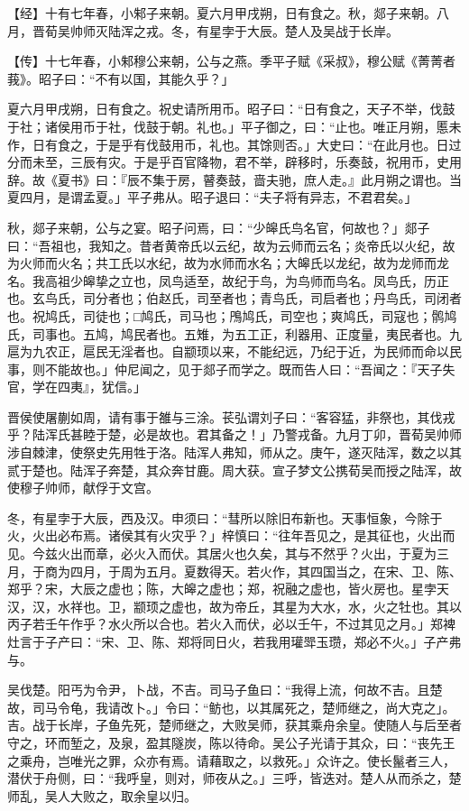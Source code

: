\documentclass[]{article}
\begin{document}
【经】十有七年春，小邾子来朝。夏六月甲戌朔，日有食之。秋，郯子来朝。八月，晋荀吴帅师灭陆浑之戎。冬，有星孛于大辰。楚人及吴战于长岸。

【传】十七年春，小邾穆公来朝，公与之燕。季平子赋《采叔》，穆公赋《菁菁者莪》。昭子曰：``不有以国，其能久乎？」

夏六月甲戌朔，日有食之。祝史请所用币。昭子曰：``日有食之，天子不举，伐鼓于社；诸侯用币于社，伐鼓于朝。礼也。」平子御之，曰：``止也。唯正月朔，慝未作，日有食之，于是乎有伐鼓用币，礼也。其馀则否。」大史曰：``在此月也。日过分而未至，三辰有灾。于是乎百官降物，君不举，辟移时，乐奏鼓，祝用币，史用辞。故《夏书》曰：『辰不集于房，瞽奏鼓，啬夫驰，庶人走。』此月朔之谓也。当夏四月，是谓孟夏。」平子弗从。昭子退曰：``夫子将有异志，不君君矣。」

秋，郯子来朝，公与之宴。昭子问焉，曰：``少皞氏鸟名官，何故也？」郯子曰：``吾祖也，我知之。昔者黄帝氏以云纪，故为云师而云名；炎帝氏以火纪，故为火师而火名；共工氏以水纪，故为水师而水名；大皞氏以龙纪，故为龙师而龙名。我高祖少皞挚之立也，凤鸟适至，故纪于鸟，为鸟师而鸟名。凤鸟氏，历正也。玄鸟氏，司分者也；伯赵氏，司至者也；青鸟氏，司启者也；丹鸟氏，司闭者也。祝鸠氏，司徒也；□鸠氏，司马也；鳲鸠氏，司空也；爽鸠氏，司寇也；鹘鸠氏，司事也。五鸠，鸠民者也。五雉，为五工正，利器用、正度量，夷民者也。九扈为九农正，扈民无淫者也。自颛顼以来，不能纪远，乃纪于近，为民师而命以民事，则不能故也。」仲尼闻之，见于郯子而学之。既而告人曰：``吾闻之：『天子失官，学在四夷』，犹信。」

晋侯使屠蒯如周，请有事于雒与三涂。苌弘谓刘子曰：``客容猛，非祭也，其伐戎乎？陆浑氏甚睦于楚，必是故也。君其备之！」乃警戎备。九月丁卯，晋荀吴帅师涉自棘津，使祭史先用牲于洛。陆浑人弗知，师从之。庚午，遂灭陆浑，数之以其贰于楚也。陆浑子奔楚，其众奔甘鹿。周大获。宣子梦文公携荀吴而授之陆浑，故使穆子帅师，献俘于文宫。

冬，有星孛于大辰，西及汉。申须曰：``彗所以除旧布新也。天事恒象，今除于火，火出必布焉。诸侯其有火灾乎？」梓慎曰：``往年吾见之，是其征也，火出而见。今兹火出而章，必火入而伏。其居火也久矣，其与不然乎？火出，于夏为三月，于商为四月，于周为五月。夏数得天。若火作，其四国当之，在宋、卫、陈、郑乎？宋，大辰之虚也；陈，大皞之虚也；郑，祝融之虚也，皆火房也。星孛天汉，汉，水祥也。卫，颛顼之虚也，故为帝丘，其星为大水，水，火之牡也。其以丙子若壬午作乎？水火所以合也。若火入而伏，必以壬午，不过其见之月。」郑裨灶言于子产曰：``宋、卫、陈、郑将同日火，若我用瓘斝玉瓒，郑必不火。」子产弗与。

吴伐楚。阳丐为令尹，卜战，不吉。司马子鱼曰：``我得上流，何故不吉。且楚故，司马令龟，我请改卜。」令曰：``鲂也，以其属死之，楚师继之，尚大克之」。吉。战于长岸，子鱼先死，楚师继之，大败吴师，获其乘舟余皇。使随人与后至者守之，环而堑之，及泉，盈其隧炭，陈以待命。吴公子光请于其众，曰：``丧先王之乘舟，岂唯光之罪，众亦有焉。请藉取之，以救死。」众许之。使长鬣者三人，潜伏于舟侧，曰：``我呼皇，则对，师夜从之。」三呼，皆迭对。楚人从而杀之，楚师乱，吴人大败之，取余皇以归。
\end{document}
